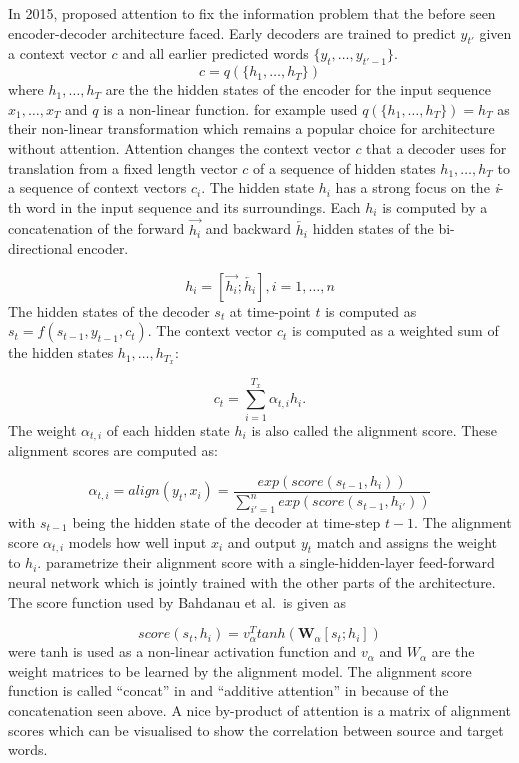 \documentclass[]{krantz}
\begin{document}
In 2015, \citet{bahdanau2014neural} proposed attention to fix the information problem that
the before seen encoder-decoder architecture faced. Early decoders are trained to predict \(y_{t'}\)
given a context vector \(c\) and all earlier predicted words \(\{y_t, \dots, y_{t'-1}\}\).
\[c=q(\{h_1,\dots,h_T\})\] where \(h_1,\dots,h_T\) are the the hidden states of the encoder for the input sequence
\(x_1,\dots, x_T\) and \(q\) is a non-linear function. \citet{sutskever2014sequence} for example used
\(q(\{h_1,\dots,h_T\}) = h_T\) as their non-linear transformation which remains a popular
choice for architecture without attention.
Attention changes the context vector \(c\) that a decoder uses for translation from a fixed
length vector \(c\) of a sequence of hidden states \(h_1, \dots, h_T\) to a sequence
of context vectors \(c_i\). The hidden state \(h_i\) has a strong focus on the \emph{i}-th
word in the input sequence and its surroundings.
Each \(h_i\) is computed by a concatenation of the forward
\(\overrightarrow{h_i}\) and backward \(\overleftarrow{h_i}\) hidden states of the
bi-directional encoder.

\[
h_i = [\overrightarrow{h_i}; \overleftarrow{h_i}], i = 1,\dots,n
\]
The hidden states of the decoder \(s_t\) at time-point \(t\) is computed as \(s_t = f(s_{t-1},y_{t-1},c_t)\).
The context vector \(c_t\) is computed as a weighted sum of the hidden
states \(h_1,\dots, h_{T_x}\):

\[
c_t = \sum^{T_x}_{i=1}\alpha_{t,i}h_i.
\]
The weight \(\alpha_{t,i}\) of each hidden state \(h_i\) is also called the alignment score.
These alignment scores are computed as:

\[
\alpha_{t,i} = align(y_t, x_i) =\frac{exp(score(s_{t-1},h_i))}{\sum^{n}_{i'=1}exp(score(s_{t-1},h_{i'}))}
\]
with \(s_{t-1}\) being the hidden state of the decoder at time-step \(t-1\).
The alignment score \(\alpha_{t,i}\) models how well input \(x_i\) and output \(y_t\) match
and assigns the weight to \(h_i\). \citet{bahdanau2014neural} parametrize their alignment
score with a single-hidden-layer feed-forward neural network which is jointly
trained with the other parts of the architecture. The score function used by Bahdanau et
al.~is given as

\[
score(s_t,h_i) = v_\alpha^Ttanh(\mathbf{W}_\alpha[s_t;h_i])
\]
were tanh is used as a non-linear activation function and \(v_\alpha\) and \(W_\alpha\)
are the weight matrices to be learned by the alignment model. The alignment score function
is called ``concat'' in \citet{luong2015effective} and ``additive attention'' in \citet{vaswani2017attention}
because of the concatenation seen above. A nice by-product of attention is a matrix of alignment scores
which can be visualised to show the correlation between source and target words.
\end{document}
